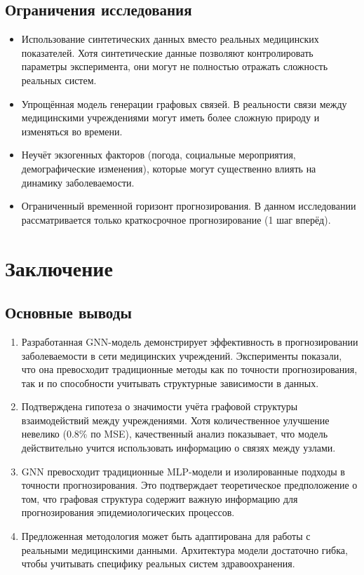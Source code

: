 \documentclass[12pt,a4paper]{article}
\begin{document}
	\subsection{Ограничения исследования}
	\begin{itemize}
		\item Использование синтетических данных вместо реальных медицинских показателей. Хотя синтетические данные позволяют контролировать параметры эксперимента, они могут не полностью отражать сложность реальных систем.
		\item Упрощённая модель генерации графовых связей. В реальности связи между медицинскими учреждениями могут иметь более сложную природу и изменяться во времени.
		\item Неучёт экзогенных факторов (погода, социальные мероприятия, демографические изменения), которые могут существенно влиять на динамику заболеваемости.
		\item Ограниченный временной горизонт прогнозирования. В данном исследовании рассматривается только краткосрочное прогнозирование (1 шаг вперёд).
	\end{itemize}
	
	\section{Заключение}
	\subsection{Основные выводы}
	\begin{enumerate}
		\item Разработанная GNN-модель демонстрирует эффективность в прогнозировании заболеваемости в сети медицинских учреждений. Эксперименты показали, что она превосходит традиционные методы как по точности прогнозирования, так и по способности учитывать структурные зависимости в данных.
		\item Подтверждена гипотеза о значимости учёта графовой структуры взаимодействий между учреждениями. Хотя количественное улучшение невелико (0.8\% по MSE), качественный анализ показывает, что модель действительно учится использовать информацию о связях между узлами.
		\item GNN превосходит традиционные MLP-модели и изолированные подходы в точности прогнозирования. Это подтверждает теоретическое предположение о том, что графовая структура содержит важную информацию для прогнозирования эпидемиологических процессов.
		\item Предложенная методология может быть адаптирована для работы с реальными медицинскими данными. Архитектура модели достаточно гибка, чтобы учитывать специфику реальных систем здравоохранения.
	\end{enumerate}
	
\end{document}
